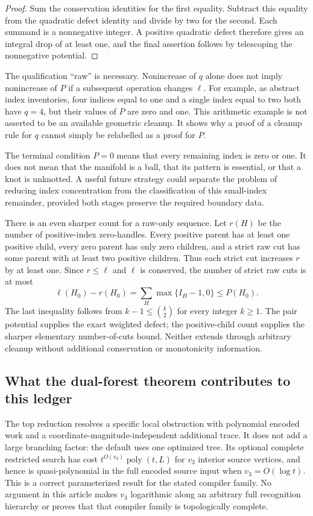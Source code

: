 \begin{proof}
Sum the conservation identities for the first equality. Subtract this
equality from the quadratic defect identity and divide by two for the
second. Each summand is a nonnegative integer. A positive quadratic defect
therefore gives an integral drop of at least one, and the final assertion
follows by telescoping the nonnegative potential.
\end{proof}

The qualification ``raw'' is necessary. Nonincrease of $q$ alone does not
imply nonincrease of $P$ if a subsequent operation changes $\ell$. For
example, as abstract index inventories, four indices equal to one and a
single index equal to two both have $q=4$, but their values of $P$ are zero
and one. This arithmetic example is not asserted to be an available
geometric cleanup. It shows why a proof of a cleanup rule for $q$ cannot
simply be relabelled as a proof for $P$.

The terminal condition $P=0$ means that every remaining index is zero or
one. It does not mean that the manifold is a ball, that its pattern is
essential, or that a knot is unknotted. A useful future strategy could
separate the problem of reducing index concentration from the classification
of this small-index remainder, provided both stages preserve the required
boundary data.

There is an even sharper count for a raw-only sequence. Let $r(H)$ be the
number of positive-index zero-handles. Every positive parent has at least
one positive child, every zero parent has only zero children, and a strict
raw cut has some parent with at least two positive children. Thus each
strict cut increases $r$ by at least one. Since $r\le\ell$ and $\ell$ is
conserved, the number of strict raw cuts is at most
\[
 \ell(H_0)-r(H_0)=\sum_H\max\{I_H-1,0\}\le P(H_0).
\]
The last inequality follows from $k-1\le\binom{k}{2}$ for every integer
$k\ge1$. The pair potential supplies the exact weighted defect; the
positive-child count supplies the sharper elementary number-of-cuts bound.
Neither extends through arbitrary cleanup without additional conservation
or monotonicity information.

\subsection{What the dual-forest theorem contributes to this ledger}

The top reduction resolves a specific local obstruction with polynomial
encoded work and a coordinate-magnitude-independent additional trace. It
does not add a large branching factor: the default uses one optimized tree.
Its optional complete restricted search has cost
$t^{O(v_3)}\operatorname{poly}(t,L)$ for $v_3$
interior source vertices, and hence is quasi-polynomial in the full encoded
source input when $v_3=O(\log t)$. This is a correct parameterized result for the stated
compiler family. No argument in this article makes $v_3$ logarithmic along
an arbitrary full recognition hierarchy or proves that that compiler family
is topologically complete.

